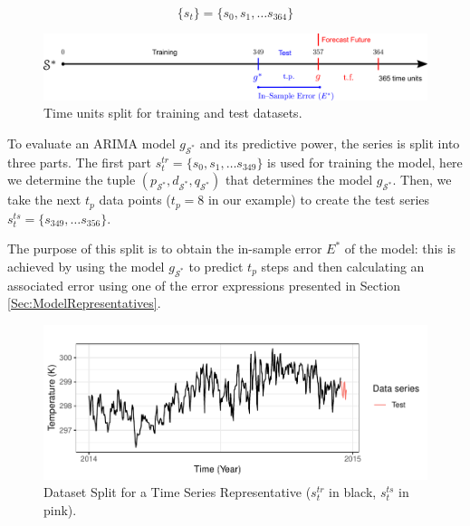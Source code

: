 \begin{equation}
    \{s_{t} \} = \{s_{0}, s_{1}, \ldots s_{364} \}
\end{equation}

\begin{figure}[h!]
	\centering
	\includegraphics[scale=0.38]{../Figures/ModelRegion_ModelTS}
	\caption{Time units split for training and test datasets.}
	\label{Fig:TimeSplit}
\end{figure}

To evaluate an ARIMA model $g_{\mathcal{S}^{*}}$ and its predictive power, the series is split into three parts. The first part $s^{tr}_t = \lbrace s_0, s_1, \ldots s_{349} \rbrace$ is used for training the model, %
here we determine the tuple $(p_{\mathcal{S}^{*}}, d_{\mathcal{S}^{*}}, q_{\mathcal{S}^{*}})$ that determines the model $g_{\mathcal{S}^{*}}$. Then, we take the next $t_p$ data points ($t_p = 8$ in our example) to create the test series $s^{ts}_t = \lbrace s_{349}, \ldots s_{356} \rbrace$.

The purpose of this split is to obtain the in-sample error ${E^*}$ of the model: this is achieved by using the model $g_{\mathcal{S}^{*}}$ to predict $t_p$ steps and then calculating an associated error using one of the error expressions presented in Section \ref{Sec:ModelRepresentatives}.

\begin{figure}[h!]
	\centering
	\includegraphics[scale=1]{../Figures/medoid_test_training}
	\caption{Dataset Split for a Time Series Representative ($s^{tr}_t$ in black, $s^{ts}_t$ in pink).}
	\label{Fig:Time-SeriesSplit}
\end{figure}

